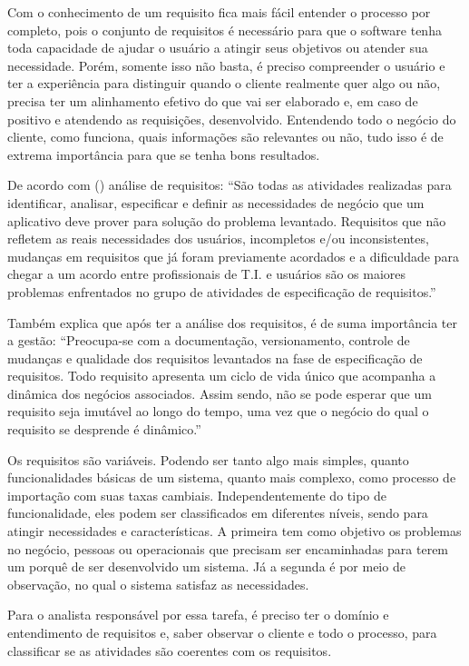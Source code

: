 Com o conhecimento de um requisito fica mais fácil entender o processo por completo, pois o conjunto de requisitos é necessário para que o software tenha toda capacidade de ajudar o usuário a atingir seus objetivos ou atender sua necessidade. Porém, somente isso não basta, é preciso compreender o usuário e ter a experiência para distinguir quando o cliente realmente quer algo ou não, precisa ter um alinhamento efetivo do que vai ser elaborado e, em caso de positivo e atendendo as requisições, desenvolvido. Entendendo todo o negócio do cliente, como funciona, quais informações são relevantes ou não, tudo isso é de extrema importância para que se tenha bons resultados.

De acordo com (\cite{machado-2011}) análise de requisitos: “São todas as atividades realizadas para identificar, analisar, especificar e definir as necessidades de negócio que um aplicativo deve prover para solução do problema levantado. Requisitos que não refletem as reais necessidades dos usuários, incompletos e/ou inconsistentes, mudanças em requisitos que já foram previamente acordados e a dificuldade para chegar a um acordo entre profissionais de T.I. e usuários são os maiores problemas enfrentados no grupo de atividades de especificação de requisitos.” 

Também explica que após ter a análise dos requisitos, é de suma importância ter a gestão: “Preocupa-se com a documentação, versionamento, controle de mudanças e qualidade dos requisitos levantados na fase de especificação de requisitos. Todo requisito apresenta um ciclo de vida único que acompanha a dinâmica dos negócios associados. Assim sendo, não se pode esperar que um requisito seja imutável ao longo do tempo, uma vez que o negócio do qual o requisito se desprende é dinâmico.”

Os requisitos são variáveis. Podendo ser tanto algo mais simples, quanto funcionalidades básicas de um sistema, quanto mais complexo, como processo de importação com suas taxas cambiais. Independentemente do tipo de funcionalidade, eles podem ser classificados em diferentes níveis, sendo para atingir necessidades e características. A primeira tem como objetivo os problemas no negócio, pessoas ou operacionais que precisam ser encaminhadas para terem um porquê de ser desenvolvido um sistema. Já a segunda é por meio de observação, no qual o sistema satisfaz as necessidades. 

Para o analista responsável por essa tarefa, é preciso ter o domínio e entendimento de requisitos e, saber observar o cliente e todo o processo, para classificar se as atividades são coerentes com os requisitos. 

